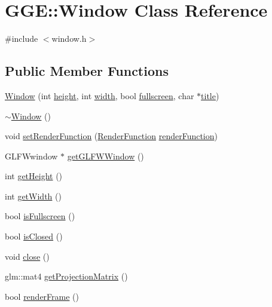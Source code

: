 \hypertarget{class_g_g_e_1_1_window}{\section{G\+G\+E\+:\+:Window Class Reference}
\label{class_g_g_e_1_1_window}
}


{\ttfamily \#include $<$window.\+h$>$}

\subsection*{Public Member Functions}
\begin{DoxyCompactItemize}
\item 
\hyperlink{class_g_g_e_1_1_window_a0be4c31554bea6a3e41b07b97ea4dd74}{Window} (int \hyperlink{class_g_g_e_1_1_window_a2aef17e23370755f4c3de24e527676ff}{height}, int \hyperlink{class_g_g_e_1_1_window_a5d878b7b885837f5062b516ecbdc22bf}{width}, bool \hyperlink{class_g_g_e_1_1_window_a43b2bb5a05e9f6d7af76086ce42145f2}{fullscreen}, char $\ast$\hyperlink{class_g_g_e_1_1_window_a9430276ac4c0ddc7e04be71772af4670}{title})
\item 
\hyperlink{class_g_g_e_1_1_window_aacf14cfd459d8c7cb78cb121327657c9}{$\sim$\+Window} ()
\item 
void \hyperlink{class_g_g_e_1_1_window_a705a031ad4ef0d5f6f08d715f2ec0e01}{set\+Render\+Function} (\hyperlink{namespace_g_g_e_ae2d6bfdcdfc2e210b6d827b4221a9dc4}{Render\+Function} \hyperlink{class_g_g_e_1_1_window_ac699c5d6c173adeea2f1e5cda44b8b9a}{render\+Function})
\item 
G\+L\+F\+Wwindow $\ast$ \hyperlink{class_g_g_e_1_1_window_a8ea51e37afd72bf174d51ea0b698a66c}{get\+G\+L\+F\+W\+Window} ()
\item 
int \hyperlink{class_g_g_e_1_1_window_ab69355bb29c63ba69fb75a8ac7b6a522}{get\+Height} ()
\item 
int \hyperlink{class_g_g_e_1_1_window_ad94d14a36c4ffcc4d97cedbe23828b7b}{get\+Width} ()
\item 
bool \hyperlink{class_g_g_e_1_1_window_af4ef9734314b74cb36417d8cabb6fb18}{is\+Fullscreen} ()
\item 
bool \hyperlink{class_g_g_e_1_1_window_ae2add48e60bfa9beb33b722176f9a0d5}{is\+Closed} ()
\item 
void \hyperlink{class_g_g_e_1_1_window_afd4c6a34bb54b77154e75fcb68fbee45}{close} ()
\item 
glm\+::mat4 \hyperlink{class_g_g_e_1_1_window_a0cb2e0dfb03bf3b9ffd0231d6e4e682c}{get\+Projection\+Matrix} ()
\item 
bool \hyperlink{class_g_g_e_1_1_window_a378a4b08b488eed0f30a4dfd552719f7}{render\+Frame} ()
\end{DoxyCompactItemize}
